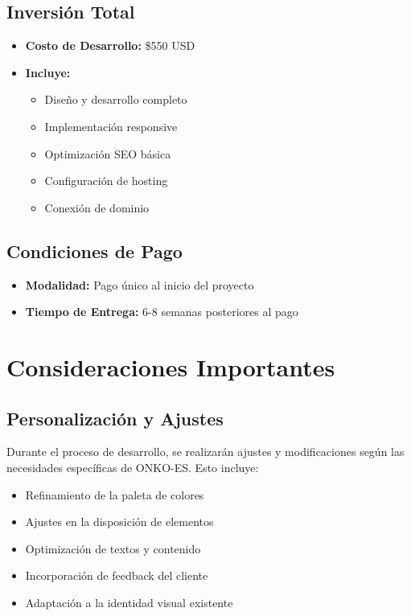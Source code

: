 \documentclass[12pt,a4paper]{article}
\begin{document}
\subsection{Inversión Total}
\begin{itemize}
    \item \textbf{Costo de Desarrollo:} \$550 USD
    \item \textbf{Incluye:}
    \begin{itemize}
        \item Diseño y desarrollo completo
        \item Implementación responsive
        \item Optimización SEO básica
        \item Configuración de hosting
        \item Conexión de dominio
    \end{itemize}
\end{itemize}

\subsection{Condiciones de Pago}
\begin{itemize}
    \item \textbf{Modalidad:} Pago único al inicio del proyecto
    \item \textbf{Tiempo de Entrega:} 6-8 semanas posteriores al pago
\end{itemize}

\section{Consideraciones Importantes}

\subsection{Personalización y Ajustes}
Durante el proceso de desarrollo, se realizarán ajustes y modificaciones según las necesidades específicas de ONKO-ES. Esto incluye:

\begin{itemize}
    \item Refinamiento de la paleta de colores
    \item Ajustes en la disposición de elementos
    \item Optimización de textos y contenido
    \item Incorporación de feedback del cliente
    \item Adaptación a la identidad visual existente
\end{itemize}
\end{document}
